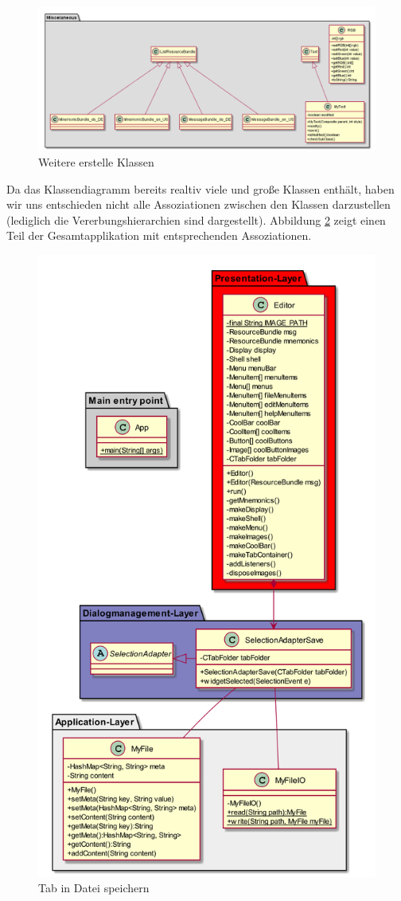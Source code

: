 \begin{figure}[H]
    \centering
    \includegraphics[width=0.7\linewidth]{figures/class/class_diagram_misc.png}
    \caption{Weitere erstelle Klassen}
    \label{fig:miscclasses}
\end{figure}

\noindent
Da das Klassendiagramm bereits realtiv viele und große Klassen enthält, haben wir uns entschieden nicht alle
Assoziationen zwischen den Klassen darzustellen (lediglich die Vererbungshierarchien sind dargestellt).
Abbildung \ref{fig:example} zeigt einen Teil der Gesamtapplikation mit entsprechenden Assoziationen.

\begin{figure}[H]
    \centering
    \includegraphics[width=0.7\linewidth]{figures/class/class_diagram_example.png}
    \caption{Tab in Datei speichern}
    \label{fig:example}
\end{figure}